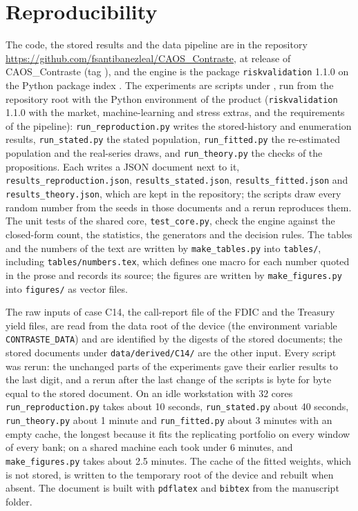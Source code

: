 \section{Reproducibility}
\label{sec:reproducibility}

The code, the stored results and the data pipeline are in the repository \url{https://github.com/fsantibanezleal/CAOS_Contraste}, at release \docversion{} of CAOS\_Contraste (tag \texttt{\docversion{}}), and the engine is the package \texttt{riskvalidation} 1.1.0 on the Python package index \citep{riskvalidation2026}. The experiments are scripts under , run from the repository root with the Python environment of the product (\texttt{riskvalidation} 1.1.0 with the market, machine-learning and stress extras, and the requirements of the pipeline): \texttt{run\_reproduction.py} writes the stored-history and enumeration results, \texttt{run\_stated.py} the stated population, \texttt{run\_fitted.py} the re-estimated population and the real-series draws, and \texttt{run\_theory.py} the checks of the propositions. Each writes a JSON document next to it, \texttt{results\_reproduction.json}, \texttt{results\_stated.json}, \texttt{results\_fitted.json} and \texttt{results\_theory.json}, which are kept in the repository; the scripts draw every random number from the seeds in those documents and a rerun reproduces them. The unit tests of the shared core, \texttt{test\_core.py}, check the engine against the closed-form count, the statistics, the generators and the decision rules. The tables and the numbers of the text are written by \texttt{make\_tables.py} into \texttt{tables/}, including \texttt{tables/numbers.tex}, which defines one macro for each number quoted in the prose and records its source; the figures are written by \texttt{make\_figures.py} into \texttt{figures/} as vector files. %

The raw inputs of case C14, the call-report file of the FDIC and the Treasury yield files, are read from the data root of the device (the environment variable \texttt{CONTRASTE\_DATA}) and are identified by the digests of the stored documents; the stored documents under \texttt{data/derived/C14/} are the other input. Every script was rerun: the unchanged parts of the experiments gave their earlier results to the last digit, and a rerun after the last change of the scripts is byte for byte equal to the stored document. On an idle workstation with 32 cores \texttt{run\_reproduction.py} takes about 10 seconds, \texttt{run\_stated.py} about 40 seconds, \texttt{run\_theory.py} about 1 minute and \texttt{run\_fitted.py} about 3 minutes with an empty cache, the longest because it fits the replicating portfolio on every window of every bank; on a shared machine each took under 6 minutes, and \texttt{make\_figures.py} takes about 2.5 minutes. The cache of the fitted weights, which is not stored, is written to the temporary root of the device and rebuilt when absent. The document is built with \texttt{pdflatex} and \texttt{bibtex} from the manuscript folder.

